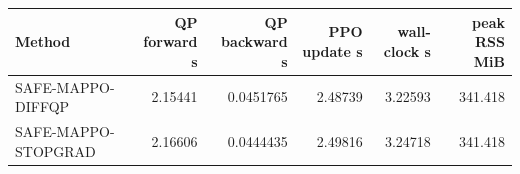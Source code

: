 \begin{tabular}{lrrrrr}
\toprule
Method & QP forward s & QP backward s & PPO update s & wall-clock s & peak RSS MiB \\
\midrule
SAFE-MAPPO-DIFFQP & 2.15441 & 0.0451765 & 2.48739 & 3.22593 & 341.418 \\
SAFE-MAPPO-STOPGRAD & 2.16606 & 0.0444435 & 2.49816 & 3.24718 & 341.418 \\
\bottomrule
\end{tabular}
